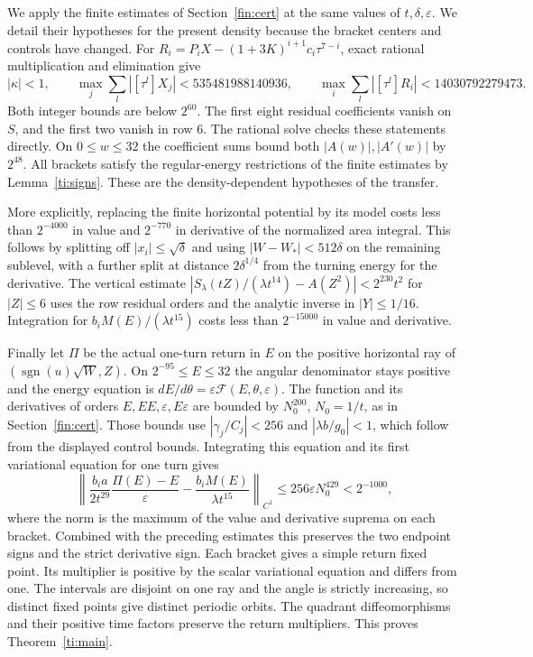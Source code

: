 We apply the finite estimates of Section~\ref{fin:cert}
at the same values of $t,\delta,\varepsilon$. We detail their hypotheses
for the present density because the bracket centers and controls have
changed. For $R_i=P_iX-(1+3K)^{i+1}c_i\tau^{7-i}$,
exact rational multiplication and elimination give
\[
 |\kappa|<1,\qquad
 \max_j\sum_l|[\tau^l]X_j|<535481988140936,\qquad
 \max_i\sum_l|[\tau^l]R_i|<14030792279473 .
\]
Both integer bounds are below $2^{60}$. \label{ti:row-residuals}The first eight residual
coefficients vanish on $S$, and the first two vanish in row 6.
The rational solve checks these statements directly.
On $0\le w\le32$ the coefficient sums bound both $|A(w)|,|A'(w)|$
by $2^{48}$. All brackets satisfy the regular-energy restrictions of the
finite estimates by Lemma~\ref{ti:signs}. These are the density-dependent
hypotheses of the transfer.

More explicitly, replacing the finite horizontal potential by its model
costs less than $2^{-4000}$ in value and $2^{-770}$ in derivative of the
normalized area integral. This follows by splitting off
$|x_i|\le\sqrt\delta$ and using $|W-W_*|<512\delta$ on the remaining
sublevel, with a further split at distance $2\delta^{1/4}$ from the
turning energy for the derivative. The vertical estimate
$|S_\lambda(tZ)/(\lambda t^{14})-A(Z^2)|<2^{230}t^2$ for $|Z|\le6$
uses the row residual orders and the analytic inverse in $|Y|\le1/16$.
Integration for $b_iM(E)/(\lambda t^{15})$ costs less than $2^{-15000}$
in value and derivative.

Finally let $\Pi$ be the actual one-turn return in $E$ on the positive
horizontal ray of $(\operatorname{sgn}(u)\sqrt W,Z)$.
On $2^{-95}\le E\le32$ the angular denominator stays positive and the
energy equation is $dE/d\theta=\varepsilon\mathcal F(E,\theta,\varepsilon)$.
The function and its derivatives of orders $E,EE,\varepsilon,E\varepsilon$
are bounded by $N_0^{200}$, $N_0=1/t$, as in Section~\ref{fin:cert}.
Those bounds use $|\gamma_j/C_j|<256$ and $|\lambda b/g_0|<1$,
which follow from the displayed control bounds. Integrating this equation
and its first variational equation for one turn gives
\[
 \left\|\frac{b_i a}{2t^{29}}\frac{\Pi(E)-E}{\varepsilon}
       -\frac{b_i M(E)}{\lambda t^{15}}\right\|_{C^1}
       \le256\varepsilon N_0^{429}<2^{-1000},
\]
where the norm is the maximum of the value and derivative suprema on
each bracket. Combined with the preceding estimates this preserves
the two endpoint signs and the strict derivative sign. Each bracket gives
a simple return fixed point. Its multiplier is positive by the scalar
variational equation and differs from one. The intervals are disjoint on
one ray and the angle is strictly increasing, so distinct fixed points
give distinct periodic orbits. The quadrant diffeomorphisms and their
positive time factors preserve the return multipliers. This proves
Theorem~\ref{ti:main}.

